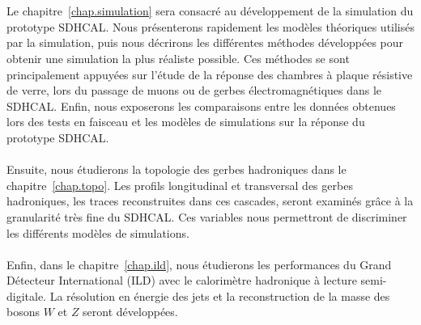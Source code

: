 \\ \\
Le chapitre~\ref{chap.simulation} sera consacré au développement de la simulation du prototype SDHCAL. Nous présenterons rapidement les modèles théoriques utilisés par la simulation, puis nous décrirons les différentes méthodes développées pour obtenir une simulation la plus réaliste possible. Ces méthodes se sont principalement appuyées sur l'étude de la réponse des chambres à plaque résistive de verre, lors du passage de muons ou de gerbes électromagnétiques dans le SDHCAL. Enfin, nous exposerons les comparaisons entre les données obtenues lors des tests en faisceau et les modèles de simulations sur la réponse du prototype SDHCAL.
\\ \\
Ensuite, nous étudierons la topologie des gerbes hadroniques dans le chapitre~\ref{chap.topo}. Les profils longitudinal et transversal des gerbes hadroniques, les traces reconstruites dans ces cascades, seront examinés grâce à la granularité très fine du SDHCAL. Ces variables nous permettront de discriminer les différents modèles de simulations.
\\ \\
Enfin, dans le chapitre~\ref{chap.ild}, nous étudierons les performances du Grand Détecteur International (ILD) avec le calorimètre hadronique à lecture semi-digitale. La résolution en énergie des jets et la reconstruction de la masse des bosons $W$ et $Z$ seront développées.
